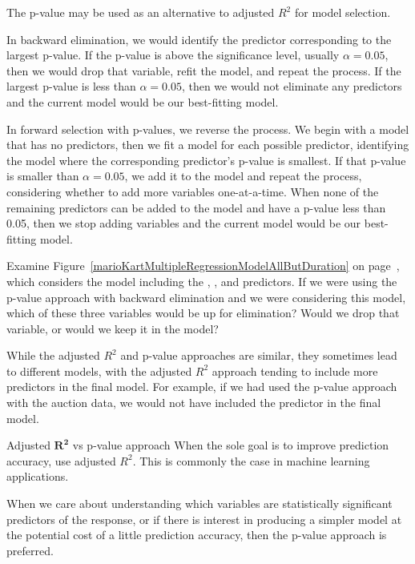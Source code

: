 The p-value may be used as an alternative to adjusted $R^2$ for model selection.

In backward elimination, we would identify the predictor corresponding to the largest p-value. If the p-value is above the significance level, usually $\alpha = 0.05$, then we would drop that variable, refit the model, and repeat the process. If the largest p-value is less than $\alpha = 0.05$, then we would not eliminate any predictors and the current model would be our best-fitting model.

In forward selection with p-values, we reverse the process. We begin with a model that has no predictors, then we fit a model for each possible predictor, identifying the model where the corresponding predictor's p-value is smallest. If that p-value is smaller than $\alpha = 0.05$, we add it to the model and repeat the process, considering whether to add more variables one-at-a-time. When none of the remaining predictors can be added to the model and have a p-value less than 0.05, then we stop adding variables and the current model would be our best-fitting model.

\begin{exercisewrap}
\begin{nexercise}
Examine Figure~\ref{marioKartMultipleRegressionModelAllButDuration} on page~\pageref{marioKartMultipleRegressionModelAllButDuration}, which considers the model including the , , and  predictors. If we were using the p-value approach with backward elimination and we were considering this model, which of these three variables would be up for elimination? Would we drop that variable, or would we keep it in the model?\footnotemark
\end{nexercise}
\end{exercisewrap}

While the adjusted $R^2$ and p-value approaches are similar, they sometimes lead to different models, with the adjusted $R^2$ approach tending to include more predictors in the final model. For example, if we had used the p-value approach with the auction data, we would not have included the  predictor in the final model.

\begin{onebox}{Adjusted $\mathbf{R^2}$ vs p-value approach}
When the sole goal is to improve prediction accuracy, use adjusted $R^2$. This is commonly the case in machine learning applications.\vspace{3mm}

When we care about understanding which variables are statistically significant predictors of the response, or if there is interest in producing a simpler model at the potential cost of a little prediction accuracy, then the p-value approach is preferred.
\end{onebox}


